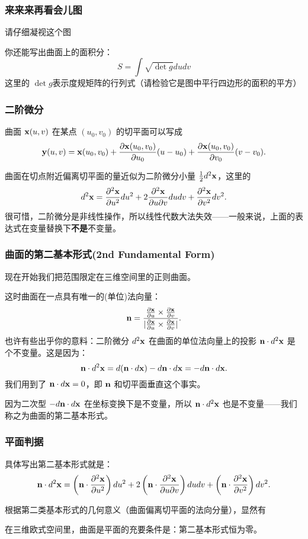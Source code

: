 \documentclass[CJK,13pt]{beamer}
\begin{document}
\begin{frame}
  \frametitle{来来来再看会儿图}
  请仔细凝视这个图
  
  
  你还能写出曲面上的面积分：
  $$ S = \int \sqrt{\det g} du dv $$
  这里的 $\det g$表示度规矩阵的行列式（请检验它是图中平行四边形的面积的平方）
\end{frame}



\begin{frame}
  \frametitle{二阶微分}
  曲面 ${\mathbf{x}}(u,v)$ 在某点 $(u_0, v_0)$ 的切平面可以写成
  $$ {\mathbf{y}}(u, v) = {\mathbf{x}}(u_0,v_0) + \frac{\partial {\mathbf{x}}(u_0,v_0)}{\partial u_0} (u-u_0)  + \frac{\partial {\mathbf{x}}(u_0,v_0)}{\partial v_0} (v-v_0).$$

  \skiplines
  
  曲面在切点附近偏离切平面的量近似为二阶微分小量 $\frac{1}{2}d^2{\mathbf{x}}$，这里的
  $$ d^2{\mathbf{x}} = \frac{\partial^2 {\mathbf{x}}}{\partial u^2} du^2 + 2\frac{\partial^2 {\mathbf{x}}}{\partial u\partial v} du dv + \frac{\partial^2 {\mathbf{x}}}{\partial v^2} dv^2.$$
  很可惜，二阶微分是非线性操作，所以线性代数大法失效——一般来说，上面的表达式在变量替换下{\bf 不是}不变量。
\end{frame}


\begin{frame}
  \frametitle{曲面的第二基本形式(2nd Fundamental Form)}
  现在开始我们把范围限定在三维空间里的正则曲面。

  这时曲面在一点具有唯一的(单位)法向量：
{\blue  $${\mathbf{n}} = \frac{\frac{\partial{\mathbf{x}}}{\partial u}\times \frac{\partial{\mathbf{x}}}{\partial v}}{\vert\frac{\partial{\mathbf{x}}}{\partial u}\times \frac{\partial{\mathbf{x}}}{\partial v}\rvert}.$$  }
  也许有些出乎你的意料：二阶微分 $d^2{\mathbf{x}}$ 在曲面的单位法向量上的投影 ${\mathbf{n}}\cdot d^2{\mathbf{x}} $ 是个不变量。这是因为：
  $$  {\mathbf{n}} \cdot d^2{\mathbf{x}} = d( {\mathbf{n}} \cdot d{\mathbf{x}}) - d{\mathbf{n}} \cdot d{\mathbf{x}} = - d{\mathbf{n}} \cdot d{\mathbf{x}}.$$
  我们用到了 ${\mathbf{n}} \cdot d{\mathbf{x}} = 0$，即 ${\mathbf{n}}$ 和切平面垂直这个事实。
  
  因为二次型 $-d{\mathbf{n}}\cdot d{\mathbf{x}}$ 在坐标变换下是不变量，所以 ${\mathbf{n}}\cdot d^2{\mathbf{x}}$ 也是不变量——我们称之为曲面的第二基本形式。
\end{frame}

\begin{frame}
  \frametitle{平面判据}
  具体写出第二基本形式就是：
{\blue $${\mathbf{n}}\cdot d^2{\mathbf{x}} =\left({\mathbf{n}}\cdot \frac{\partial^2 {\mathbf{x}}}{\partial u^2}\right) du^2 + 2\left({\mathbf{n}}\cdot\frac{\partial^2 {\mathbf{x}}}{\partial u\partial v}\right) du dv + \left({\mathbf{n}}\cdot\frac{\partial^2 {\mathbf{x}}}{\partial v^2}\right) dv^2.$$}
  
  根据第二类基本形式的几何意义（曲面偏离切平面的法向分量），显然有
  
  {\blue 在三维欧式空间里，曲面是平面的充要条件是：第二基本形式恒为零。}
\end{frame}
\end{document}
